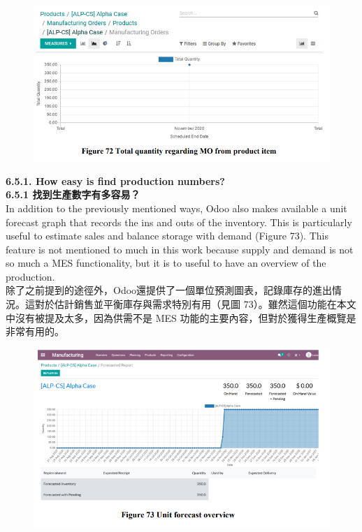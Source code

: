 \documentclass[12pt,a4paper]{report}  %
\begin{document}
\begin{figure}[htbp]
  \centering
  \includegraphics[]{image/603.png}
  \label{fig:603}
\end{figure}

\Large\textbf{6.5.1. How easy is find production numbers?}\\
\Large\textbf{6.5.1 找到生產數字有多容易？}\\

In addition to the previously mentioned ways, Odoo also makes available a unit forecast graph that records the ins and outs of the inventory. This is particularly useful to estimate sales and balance storage with demand (Figure 73). This feature is not mentioned to much in this work because supply and demand is not so much a MES functionality, but it is to useful 
to have an overview of the production.\\
除了之前提到的途徑外，Odoo還提供了一個單位預測圖表，記錄庫存的進出情況。這對於估計銷售並平衡庫存與需求特別有用（見圖 73）。雖然這個功能在本文中沒有被提及太多，因為供需不是 MES 功能的主要內容，但對於獲得生產概覽是非常有用的。\\

\begin{figure}[htbp]
  \centering
  \includegraphics[]{image/604.png}
  \label{fig:604}
\end{figure}
\end{document}
